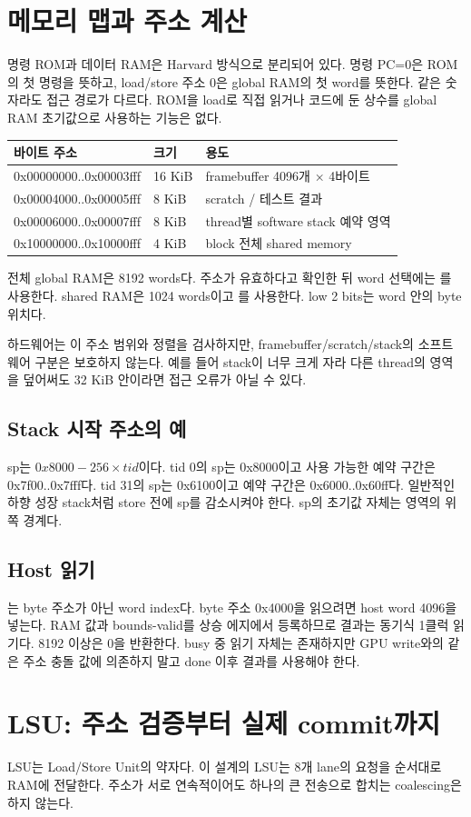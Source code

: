 \documentclass[a4paper,11pt]{article}
\newcommand{\code}[1]{\texttt{\detokenize{#1}}}
\newcommand{\chapterpage}[1]{\clearpage\section{#1}}
\begin{document}
\chapterpage{메모리 맵과 주소 계산}
명령 ROM과 데이터 RAM은 Harvard 방식으로 분리되어 있다. 명령 PC=0은 ROM의 첫 명령을 뜻하고, load/store 주소 0은 global RAM의 첫 word를 뜻한다. 같은 숫자라도 접근 경로가 다르다. ROM을 load로 직접 읽거나 코드에 둔 상수를 global RAM 초기값으로 사용하는 기능은 없다.
\par\medskip
\begin{tabularx}{\linewidth}{p{56mm}p{20mm}Y}
\toprule 바이트 주소 & 크기 & 용도 \\\midrule
0x00000000..0x00003fff & 16 KiB & framebuffer 4096개 × 4바이트\\
0x00004000..0x00005fff & 8 KiB & scratch / 테스트 결과\\
0x00006000..0x00007fff & 8 KiB & thread별 software stack 예약 영역\\
0x10000000..0x10000fff & 4 KiB & block 전체 shared memory\\
\bottomrule
\end{tabularx}
\par\medskip
전체 global RAM은 8192 words다. 주소가 유효하다고 확인한 뒤 word 선택에는 \code{addr[14:2]}를 사용한다. shared RAM은 1024 words이고 \code{addr[11:2]}를 사용한다. low 2 bits는 word 안의 byte 위치다.

하드웨어는 이 주소 범위와 정렬을 검사하지만, framebuffer/scratch/stack의 소프트웨어 구분은 보호하지 않는다. 예를 들어 stack이 너무 크게 자라 다른 thread의 영역을 덮어써도 32 KiB 안이라면 접근 오류가 아닐 수 있다.
\subsection{Stack 시작 주소의 예}
sp는 $0x8000-256\times tid$이다. tid 0의 sp는 0x8000이고 사용 가능한 예약 구간은 0x7f00..0x7fff다. tid 31의 sp는 0x6100이고 예약 구간은 0x6000..0x60ff다. 일반적인 하향 성장 stack처럼 store 전에 sp를 감소시켜야 한다. sp의 초기값 자체는 영역의 위쪽 경계다.
\subsection{Host 읽기}
\code{host_word}는 byte 주소가 아닌 word index다. byte 주소 0x4000을 읽으려면 host word 4096을 넣는다. RAM 값과 bounds-valid를 상승 에지에서 등록하므로 결과는 동기식 1클럭 읽기다. 8192 이상은 0을 반환한다. busy 중 읽기 자체는 존재하지만 GPU write와의 같은 주소 충돌 값에 의존하지 말고 done 이후 결과를 사용해야 한다.

\chapterpage{LSU: 주소 검증부터 실제 commit까지}
LSU는 Load/Store Unit의 약자다. 이 설계의 LSU는 8개 lane의 요청을 순서대로 RAM에 전달한다. 주소가 서로 연속적이어도 하나의 큰 전송으로 합치는 coalescing은 하지 않는다.
\end{document}
